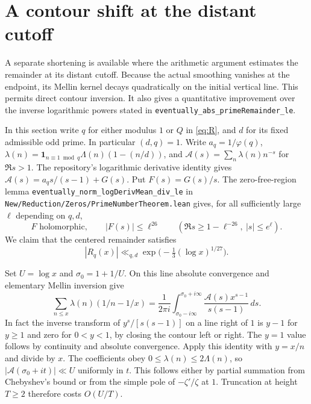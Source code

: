 \section{A contour shift at the distant cutoff}
\label{sec:perron}

A separate shortening is available where the arithmetic argument estimates
the remainder at its distant cutoff. Because the actual smoothing vanishes
at the endpoint, its Mellin kernel decays quadratically on the initial
vertical line. This permits direct contour inversion. It also gives a
quantitative improvement over the inverse logarithmic powers stated in
\texttt{eventually\_abs\_primeRemainder\_le}.

In this section write $q$ for either modulus $1$ or $Q$ in \eqref{eq:R}, and $d$ for its fixed admissible odd prime. In particular $(d,q)=1$. Write $a_q=1/\varphi(q)$,
$\lambda(n)=\mathbf1_{n\equiv1\bmod q}\Lambda(n)(1-(n/d))$, and
$\mathcal A(s)=\sum_n\lambda(n)n^{-s}$ for $\Re s>1$.
The repository's logarithmic derivative identity gives
$\mathcal A(s)=a_qs/(s-1)+G(s)$. Put $F(s)=G(s)/s$.
The zero-free-region lemma
\texttt{eventually\_norm\_logDerivMean\_div\_le}
in \texttt{New/Reduction/Zeros/PrimeNumberTheorem.lean}
gives, for all sufficiently large $\ell$ depending on $q,d$,
\[
 F \text{ holomorphic},\qquad |F(s)|\le\ell^{26}
 \qquad (\Re s\ge1-\ell^{-26},\ |s|\le e^\ell).
\]
We claim that the centered remainder satisfies
\begin{equation}
 |R_q(x)|\ll_{q,d}\exp\bigl(-\tfrac13(\log x)^{1/27}\bigr).
 \label{eq:perron-improvement}
\end{equation}

Set $U=\log x$ and $\sigma_0=1+1/U$. On this line absolute convergence
and elementary Mellin inversion give
\[
 \sum_{n\le x}\lambda(n)(1/n-1/x)
 =\frac1{2\pi i}\int_{\sigma_0-i\infty}^{\sigma_0+i\infty}
           \frac{\mathcal A(s)x^{s-1}}{s(s-1)}\,ds .
\]
In fact the inverse transform of $y^s/[s(s-1)]$ on a line right of $1$
is $y-1$ for $y\ge1$ and zero for $0<y<1$, by closing the contour
left or right. The $y=1$ value follows by continuity and absolute
convergence. Apply this identity with $y=x/n$ and divide by $x$.
The coefficients obey $0\le\lambda(n)\le2\Lambda(n)$, so
$|\mathcal A(\sigma_0+it)|\ll U$ uniformly in $t$.
This follows either by partial summation from Chebyshev's bound or from
the simple pole of $-\zeta'/\zeta$ at $1$. Truncation at height $T\ge2$
therefore costs $O(U/T)$.

